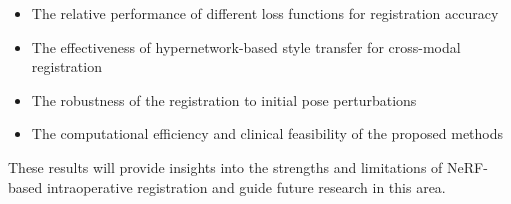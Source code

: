 \begin{itemize}
    \item The relative performance of different loss functions for registration accuracy
    \item The effectiveness of hypernetwork-based style transfer for cross-modal registration
    \item The robustness of the registration to initial pose perturbations
    \item The computational efficiency and clinical feasibility of the proposed methods
\end{itemize}

These results will provide insights into the strengths and limitations of NeRF-based intraoperative registration and guide future research in this area. 